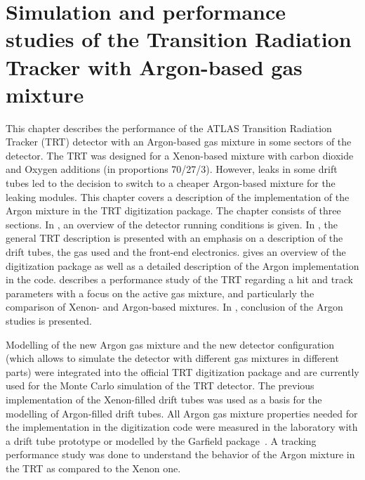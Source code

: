 \chapter{Simulation and performance studies of the Transition Radiation Tracker with Argon-based gas mixture}
\label{chap:TRT}


This chapter describes the performance of the ATLAS Transition Radiation Tracker (TRT) detector with an Argon-based gas mixture in some sectors of the detector.
The TRT was designed for a Xenon-based mixture with carbon dioxide and Oxygen additions (in proportions 70/27/3).
However, leaks in some drift tubes led to the decision to switch to a cheaper Argon-based mixture for the leaking modules.
This chapter covers a description of the implementation of the Argon mixture in the TRT digitization package.
The chapter consists of three sections. In , an overview of the detector running conditions is given. In , the general TRT description is presented with an emphasis on a description of the drift tubes, the gas used and the front-end electronics.
 gives an overview of the digitization package as well as a detailed description of the Argon implementation in the code.
 describes a performance study of the TRT regarding a hit and track parameters with a focus on the active gas mixture, and particularly the comparison of 
Xenon- and Argon-based mixtures.
In , conclusion of the Argon studies is presented.

Modelling of the new Argon gas mixture and the new detector configuration (which allows to simulate the detector with different gas mixtures in different parts) 
were integrated into the official TRT digitization package and are currently used for the Monte Carlo simulation of the TRT detector. 
The previous implementation of the Xenon-filled drift tubes was used as a basis for the modelling of Argon-filled drift tubes.
All Argon gas mixture properties needed for the implementation in the digitization code were measured in the laboratory with a drift tube prototype 
or modelled by the Garfield package~\cite{garfield_program}.
A tracking performance study was done to understand the behavior of the Argon mixture in the TRT as compared to the Xenon one.

